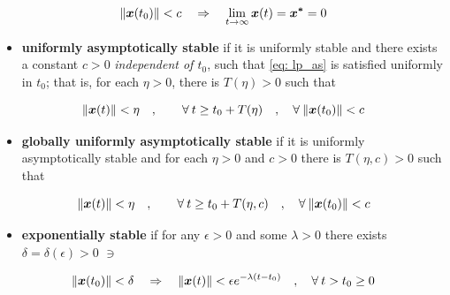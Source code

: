 \documentclass[12pt]{ucthesis}
\begin{document}
\begin{defn}
\begin{equation}
		\lVert \boldsymbol{x}(t_0)\rVert < c \quad \Rightarrow \quad  \lim_{t\rightarrow\infty} \boldsymbol{x}(t) = \boldsymbol{x^*} = 0 
		\label{eq: lp_as}
		\end{equation}
	\begin{itemize}[noitemsep,nosep,labelindent=\parindent,leftmargin=\parindent]%
		\item{\textbf{uniformly asymptotically stable} if it is uniformly stable and there exists a constant $c>0$ \textit{independent of $t_0$}, such that \autoref{eq: lp_as} is satisfied uniformly in $t_0$; that is, for each $\eta>0$, there is $T(\eta)>0$ such that}
	\end{itemize}
		\begin{equation}
		\lVert \boldsymbol{x}(t)\rVert < \eta \quad,\qquad \forall \: t \geq t_0 + T(\eta) \quad,\quad \forall \: \lVert \boldsymbol{x}(t_0) \rVert < c 
		\label{eq: lp_uas}
		\end{equation}
	\begin{itemize}[noitemsep,nosep,labelindent=\parindent,leftmargin=\parindent]%
		\item{\textbf{globally uniformly asymptotically stable} if it is uniformly asymptotically stable and for each $\eta>0$ and $c>0$ there is $T(\eta,c)>0$ such that}
	\end{itemize}
		\begin{equation}
		\lVert \boldsymbol{x}(t)\rVert < \eta \quad,\qquad \forall \: t \geq t_0 + T(\eta,c) \quad,\quad \forall \: \lVert \boldsymbol{x}(t_0) \rVert < c 
		\label{eq: lp_guas}	
		\end{equation}
	\begin{itemize}[noitemsep,nosep,labelindent=\parindent,leftmargin=\parindent]%
		\item{\textbf{exponentially stable} if for any $\epsilon > 0$ and some $\lambda > 0$ there exists $\delta = \delta (\epsilon) > 0$ $\ni$}
	\end{itemize}
		\begin{equation}
		\lVert \boldsymbol{x}(t_0) \rVert < \delta \quad \Rightarrow \quad \lVert \boldsymbol{x}(t) \rVert < \epsilon e^{-{\lambda}(t-t_0)} \quad,\quad \forall \: t > t_0 \geq 0
		\label{eq: lp_es}	
		\end{equation}
	\label{defn: lyapunov_stability}
\end{defn}%
%
\end{document}
